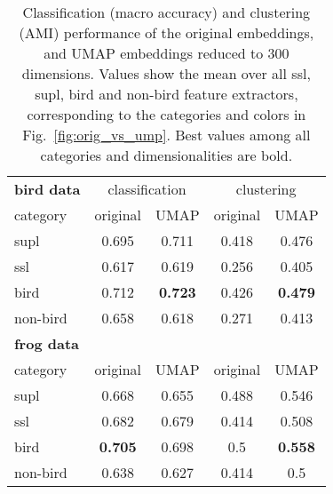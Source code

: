 \begin{table}[t]
  
  \caption{Classification (macro accuracy) and clustering (AMI) performance of the original embeddings, and UMAP embeddings reduced to 300 dimensions. Values show the mean over all ssl, supl, bird and non-bird feature extractors, corresponding to the categories and colors in Fig.~\ref{fig:orig_vs_ump}. Best values among all categories and dimensionalities are bold.}
  \label{tab:results}
  \centering
  \begin{tabular}{l|cc|cc}
    \hline
    \textbf{bird data}& \multicolumn{2}{c|}{classification} & \multicolumn{2}{c}{clustering}\\
    category &
    original &
    UMAP &
    original &
    UMAP \\
    \hline
    supl & 0.695 & {0.711} & 0.418 & {0.476}\\
    ssl & 0.617 & {0.619} & 0.256 & {0.405}\\
    bird & 0.712 & {\textbf{0.723}} & 0.426 & {\textbf{0.479}}\\
    non-bird & {0.658} & 0.618 & 0.271 & {0.413}\\
    \textbf{frog data}& &&& \\
    category &
    original &
    UMAP &
    original &
    UMAP \\
    \hline
    supl & {0.668} & 0.655 & 0.488 & {0.546}\\
    ssl & {0.682} & 0.679 & 0.414 & {0.508}\\
    bird & {\textbf{0.705}} & 0.698 & 0.5 & {\textbf{0.558}}\\
    non-bird & 0.638 & 0.627 & 0.414 & {0.5}\\
    
    
  \end{tabular}
\end{table}